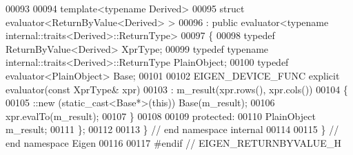 \begin{DoxyCode}
00093   
00094 \textcolor{keyword}{template}<\textcolor{keyword}{typename} Derived>
00095 \textcolor{keyword}{struct }evaluator<ReturnByValue<Derived> >
00096   : \textcolor{keyword}{public} evaluator<typename internal::traits<Derived>::ReturnType>
00097 \{
00098   \textcolor{keyword}{typedef} ReturnByValue<Derived> XprType;
00099   \textcolor{keyword}{typedef} \textcolor{keyword}{typename} internal::traits<Derived>::ReturnType PlainObject;
00100   \textcolor{keyword}{typedef} evaluator<PlainObject> Base;
00101   
00102   EIGEN\_DEVICE\_FUNC \textcolor{keyword}{explicit} evaluator(\textcolor{keyword}{const} XprType& xpr)
00103     : m\_result(xpr.rows(), xpr.cols())
00104   \{
00105     ::new (static\_cast<Base*>(\textcolor{keyword}{this})) Base(m\_result);
00106     xpr.evalTo(m\_result);
00107   \}
00108 
00109 protected:
00110   PlainObject m\_result;
00111 \};
00112 
00113 \} \textcolor{comment}{// end namespace internal}
00114 
00115 \} \textcolor{comment}{// end namespace Eigen}
00116 
00117 \textcolor{preprocessor}{#endif // EIGEN\_RETURNBYVALUE\_H}
\end{DoxyCode}
